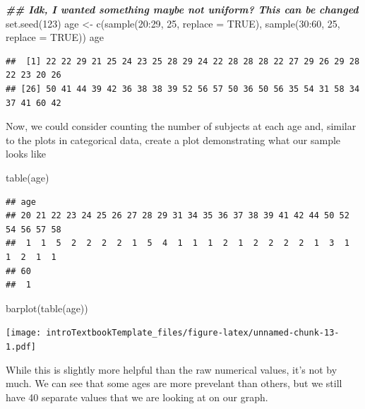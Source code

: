 \documentclass[
]{book}
\newenvironment{Shaded}{\begin{snugshade}}{\end{snugshade}}
\newcommand{\AttributeTok}[1]{\textcolor[rgb]{0.77,0.63,0.00}{#1}}
\newcommand{\ConstantTok}[1]{\textcolor[rgb]{0.00,0.00,0.00}{#1}}
\newcommand{\DecValTok}[1]{\textcolor[rgb]{0.00,0.00,0.81}{#1}}
\newcommand{\DocumentationTok}[1]{\textcolor[rgb]{0.56,0.35,0.01}{\textbf{\textit{#1}}}}
\newcommand{\FunctionTok}[1]{\textcolor[rgb]{0.00,0.00,0.00}{#1}}
\newcommand{\NormalTok}[1]{#1}
\newcommand{\OtherTok}[1]{\textcolor[rgb]{0.56,0.35,0.01}{#1}}
\newcommand{\SpecialCharTok}[1]{\textcolor[rgb]{0.00,0.00,0.00}{#1}}
\theoremstyle{definition}
\theoremstyle{definition}
\theoremstyle{definition}
\theoremstyle{remark}
\begin{document}
\begin{Shaded}
\begin{Highlighting}[]
\DocumentationTok{\#\# Idk, I wanted something maybe not uniform? This can be changed}
\FunctionTok{set.seed}\NormalTok{(}\DecValTok{123}\NormalTok{)}
\NormalTok{age }\OtherTok{\textless{}{-}} \FunctionTok{c}\NormalTok{(}\FunctionTok{sample}\NormalTok{(}\DecValTok{20}\SpecialCharTok{:}\DecValTok{29}\NormalTok{, }\DecValTok{25}\NormalTok{, }\AttributeTok{replace =} \ConstantTok{TRUE}\NormalTok{), }\FunctionTok{sample}\NormalTok{(}\DecValTok{30}\SpecialCharTok{:}\DecValTok{60}\NormalTok{, }\DecValTok{25}\NormalTok{, }\AttributeTok{replace =} \ConstantTok{TRUE}\NormalTok{))}
\NormalTok{age}
\end{Highlighting}
\end{Shaded}

\begin{verbatim}
##  [1] 22 22 29 21 25 24 23 25 28 29 24 22 28 28 28 22 27 29 26 29 28 22 23 20 26
## [26] 50 41 44 39 42 36 38 38 39 52 56 57 50 36 50 56 35 54 31 58 34 37 41 60 42
\end{verbatim}

Now, we could consider counting the number of subjects at each age and, similar to the plots in categorical data, create a plot demonstrating what our sample looks like

\begin{Shaded}
\begin{Highlighting}[]
\FunctionTok{table}\NormalTok{(age)}
\end{Highlighting}
\end{Shaded}

\begin{verbatim}
## age
## 20 21 22 23 24 25 26 27 28 29 31 34 35 36 37 38 39 41 42 44 50 52 54 56 57 58 
##  1  1  5  2  2  2  2  1  5  4  1  1  1  2  1  2  2  2  2  1  3  1  1  2  1  1 
## 60 
##  1
\end{verbatim}

\begin{Shaded}
\begin{Highlighting}[]
\FunctionTok{barplot}\NormalTok{(}\FunctionTok{table}\NormalTok{(age))}
\end{Highlighting}
\end{Shaded}

\texttt{[image: introTextbookTemplate\_files/figure-latex/unnamed-chunk-13-1.pdf]}

While this is slightly more helpful than the raw numerical values, it's not by much. We can see that some ages are more prevelant than others, but we still have 40 separate values that we are looking at on our graph.
\end{document}
